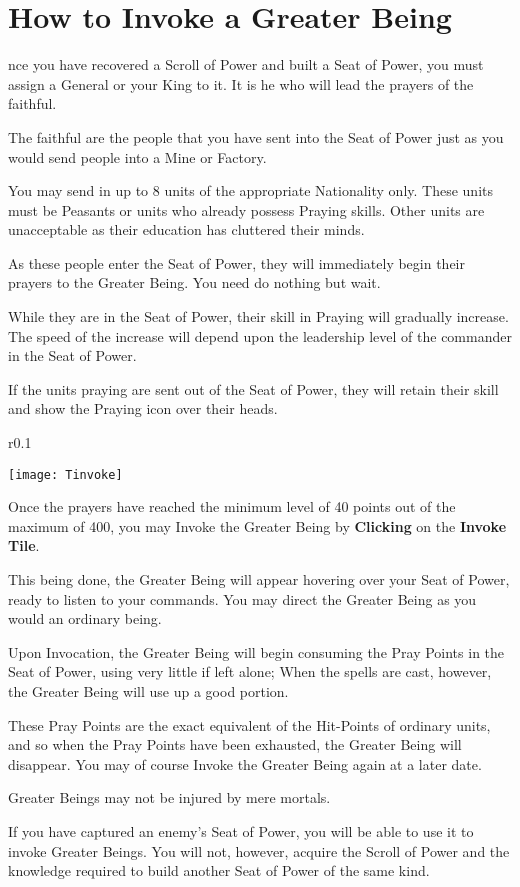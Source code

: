 \section{How to Invoke a Greater Being}


nce you have recovered a Scroll of Power and built a Seat of Power, you must assign a General or your King to it. It is he who will lead the prayers of the faithful.

The faithful are the people that you have sent into the Seat of Power just as you would send people into a Mine or Factory.

You may send in up to 8 units of the appropriate Nationality only. These units must be Peasants or units who already possess Praying skills. Other units are unacceptable as their education has cluttered their minds.

As these people enter the Seat of Power, they will immediately begin their prayers to the Greater Being. You need do nothing but wait.

While they are in the Seat of Power, their skill in Praying will gradually increase. The speed of the increase will depend upon the leadership level of the commander in the Seat of Power.

If the units praying are sent out of the Seat of Power, they will retain their skill and show the Praying icon over their heads.

\begin{wrapfigure}{r}{0.1\textwidth}
    \vspace{-20pt}
    \begin{center}
        \texttt{[image: Tinvoke]}
    \end{center}
    \vspace{-20pt}
\end{wrapfigure}

Once the prayers have reached the minimum level of 40 points out of the maximum of 400, you may Invoke the Greater Being by \textbf{Clicking} on the \textbf{Invoke Tile}.

This being done, the Greater Being will appear hovering over your Seat of Power, ready to listen to your commands. You may direct the Greater Being as you would an ordinary being.

Upon Invocation, the Greater Being will begin consuming the Pray Points in the Seat of Power, using very little if left alone; When the spells are cast, however, the Greater Being will use up a good portion.

These Pray Points are the exact equivalent of the Hit-Points of ordinary units, and so when the Pray Points have been exhausted, the Greater Being will disappear. You may of course Invoke the Greater Being again at a later date.

Greater Beings may not be injured by mere mortals.

If you have captured an enemy’s Seat of Power, you will be able to use it to invoke Greater Beings. You will not, however, acquire the Scroll of Power and the knowledge required to build another Seat of Power of the same kind.
